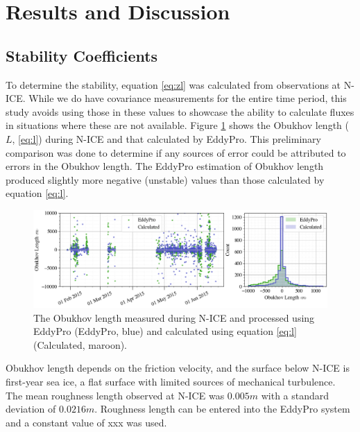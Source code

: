 \section{Results and Discussion}

\subsection{Stability Coefficients}
To determine the stability, equation \ref{eq:zl} was calculated from observations at N-ICE. While we do have covariance measurements for the entire time period, this study avoids using those in these values to showcase the ability to calculate fluxes in situations where these are not available. Figure \ref{fig:ol} shows the Obukhov length ($L$, \ref{eq:l}) during N-ICE and that calculated by EddyPro. This preliminary comparison was done to determine if any sources of error could be attributed to errors in the Obukhov length. The EddyPro estimation of Obukhov length produced slightly more negative (unstable) values than those calculated by equation \ref{eq:l}. 

\begin{figure}[H]
    \centering
    \includegraphics[width=1\linewidth]{figures/chapter3/ch3_obukhovlength.png}
    \caption[Obukhov length]{The Obukhov length measured during N-ICE and processed using EddyPro (EddyPro, blue) and calculated using equation \ref{eq:l} (Calculated, maroon).}
    \label{fig:ol}
\end{figure}

Obukhov length depends on the friction velocity, and the surface below N-ICE is first-year sea ice, a flat surface with limited sources of mechanical turbulence. The mean roughness length observed at N-ICE was $0.005 m$ with a standard deviation of $0.0216 m$. Roughness length can be entered into the EddyPro system and a constant value of xxx was used. 


